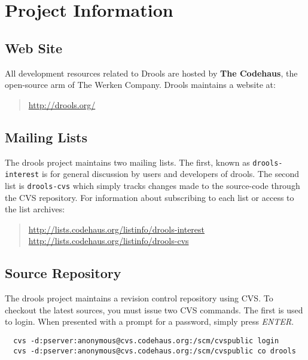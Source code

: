 \chapter{Project Information}


\section{Web Site}

All development resources related to Drools are hosted by 
\textbf{The Codehaus}, the open-source 
arm of The Werken Company. Drools maintains a website at:

\begin{quote}
	\url{http://drools.org/}
\end{quote}


\section{Mailing Lists}

The drools project maintains two mailing lists.  The first, known as
\verb|drools-interest| is for general discussion by users and
developers of drools.  The second list is \verb|drools-cvs| which
simply tracks changes made to the source-code through the CVS
repository. For information about subscribing to each list or access 
to the list archives:

\begin{quote}
    \url{http://lists.codehaus.org/listinfo/drools-interest}\\
    \url{http://lists.codehaus.org/listinfo/drools-cvs}
\end{quote}

\section{Source Repository}

The drools project maintains a revision control repository using
CVS.  To checkout the latest sources, you must issue two CVS commands.
The first is used to login.  When presented with a prompt for a
password, simply press \emph{ENTER}.

{\small
\begin{verbatim}
  cvs -d:pserver:anonymous@cvs.codehaus.org:/scm/cvspublic login
  cvs -d:pserver:anonymous@cvs.codehaus.org:/scm/cvspublic co drools
\end{verbatim}
}

\clearpage

